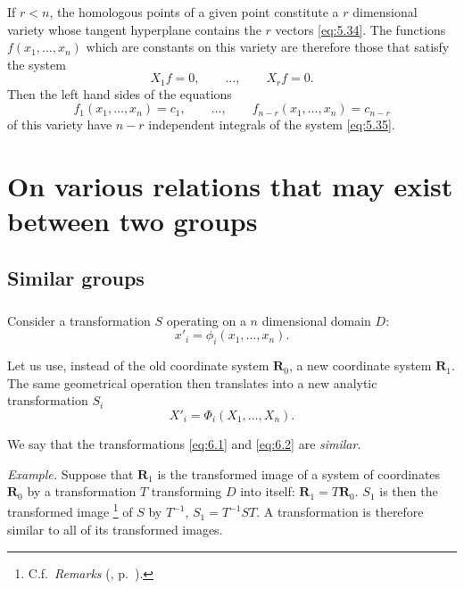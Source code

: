 If $r<n$, the homologous points of a given point constitute a $r$ dimensional variety whose tangent hyperplane contains the $r$ vectors \eqref{eq:5.34}. The functions $f(x_{1},\dots,x_{n})$ which are constants on this variety are therefore those that satisfy the system
\begin{equation}
  \label{eq:5.35}
  X_{1}f=0,\qquad \dots,\qquad X_{r}f=0.
\end{equation}
Then the left hand sides of the equations
\[
f_{1}(x_{1},\dots,x_{n})=c_{1},\qquad\dots,\qquad f_{n-r}(x_{1},\dots,x_{n})=c_{n-r}
\]
of this variety have $n-r$ independent integrals of the system \eqref{eq:5.35}.


\chapter{On various relations that may exist between two groups}
\label{cha:vari-relat-that}

\section{Similar groups}
\label{sec:similar-groups}

\paragraph{}
\label{sec:88}
Consider a transformation $S$ operating on a $n$ dimensional domain $D$:
\begin{equation}
  \label{eq:6.1}
  x'_{i}=\phi_{i}(x_{1},\dots,x_{n}).
\end{equation}

Let us use, instead of the old coordinate system $\mathbf{R}_{0}$, a new coordinate system $\mathbf{R}_{1}$. The same geometrical operation then translates into a new analytic transformation $S_{i}$
\begin{equation}
  \label{eq:6.2}
  X'_{i}=\Phi_{i}(X_{1},\dots,X_{n}).
\end{equation}

We say that the transformations \eqref{eq:6.1} and  \eqref{eq:6.2} are \emph{similar}.

\somespace

{\small
\emph{Example.} Suppose that $\mathbf{R}_{1}$ is the transformed image of a system of coordinates $\mathbf{R}_{0}$ by a transformation $T$ transforming $D$ into itself: $\mathbf{R}_{1}=T\mathbf{R}_{0}$. $S_{1}$ is then the transformed image \footnote{C.f.~\emph{Remarks} (, p.~\pageref{sec:61}).} of $S$ by $T^{-1}$, $S_{1}=T^{-1}ST$. A transformation is therefore similar to all of its transformed images.
}


